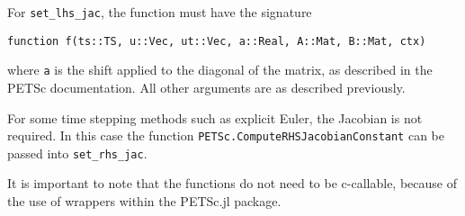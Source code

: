 \documentclass{article}
\begin{document}
For \texttt{set\_lhs\_jac}, the function must have the signature

\begin{verbatim}
function f(ts::TS, u::Vec, ut::Vec, a::Real, A::Mat, B::Mat, ctx)
\end{verbatim}
\noindent where \texttt{a} is the shift applied to the diagonal of the matrix, as 
described in the PETSc documentation.  All other arguments are as described
previously.

For some time stepping methods such as explicit Euler, the Jacobian is not 
required.  In this case the function \texttt{PETSc.ComputeRHSJacobianConstant}
can be passed into \texttt{set\_rhs\_jac}.

It is important to note that the functions do not need to be c-callable, 
because of the use of wrappers within the PETSc.jl package.
\end{document}

